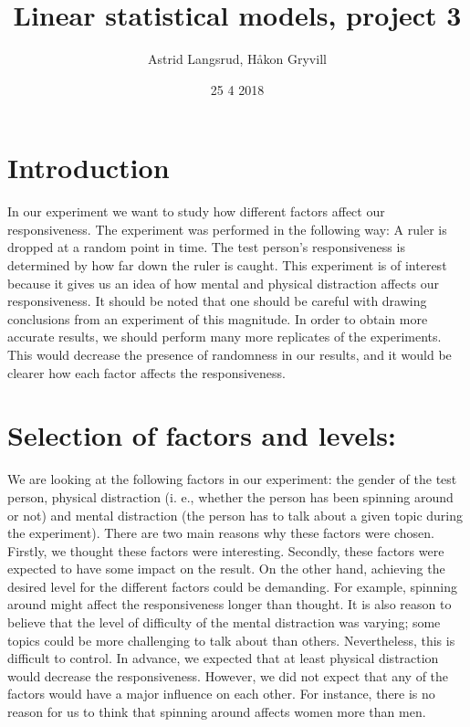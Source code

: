 \documentclass[]{article}
\title{Linear statistical models, project 3}
\author{Astrid Langsrud, Håkon Gryvill}
\date{25 4 2018}
\begin{document}
\maketitle

\section{Introduction}\label{introduction}

In our experiment we want to study how different factors affect our
responsiveness. The experiment was performed in the following way: A
ruler is dropped at a random point in time. The test person's
responsiveness is determined by how far down the ruler is caught. This
experiment is of interest because it gives us an idea of how mental and
physical distraction affects our responsiveness. It should be noted that
one should be careful with drawing conclusions from an experiment of
this magnitude. In order to obtain more accurate results, we should
perform many more replicates of the experiments. This would decrease the
presence of randomness in our results, and it would be clearer how each
factor affects the responsiveness.

\section{Selection of factors and
levels:}\label{selection-of-factors-and-levels}

We are looking at the following factors in our experiment: the gender of
the test person, physical distraction (i. e., whether the person has
been spinning around or not) and mental distraction (the person has to
talk about a given topic during the experiment). There are two main
reasons why these factors were chosen. Firstly, we thought these factors
were interesting. Secondly, these factors were expected to have some
impact on the result. On the other hand, achieving the desired level for
the different factors could be demanding. For example, spinning around
might affect the responsiveness longer than thought. It is also reason
to believe that the level of difficulty of the mental distraction was
varying; some topics could be more challenging to talk about than
others. Nevertheless, this is difficult to control. In advance, we
expected that at least physical distraction would decrease the
responsiveness. However, we did not expect that any of the factors would
have a major influence on each other. For instance, there is no reason
for us to think that spinning around affects women more than men.
\end{document}
